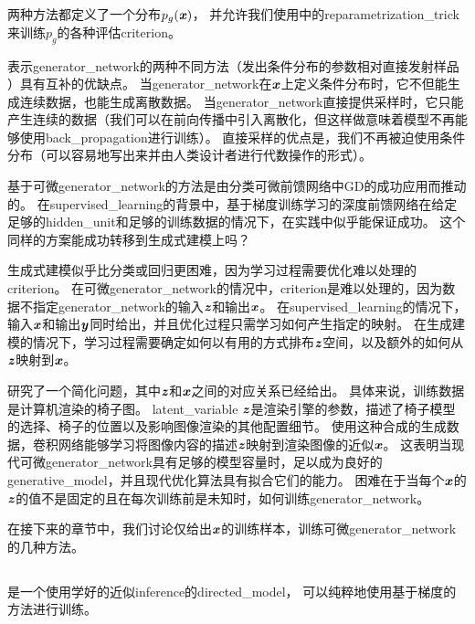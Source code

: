 两种方法都定义了一个分布$p_g(\boldsymbol{\mathit{x}})$， 并允许我们使用中的\gls{reparametrization_trick}来训练$p_g$的各种评估\gls{criterion}。


表示\gls{generator_network}的两种不同方法（发出条件分布的参数相对直接发射样品 ）具有互补的优缺点。
当\gls{generator_network}在$\boldsymbol{\mathit{x}}$上定义条件分布时，它不但能生成连续数据，也能生成离散数据。
当\gls{generator_network}直接提供采样时，它只能产生连续的数据（我们可以在前向传播中引入离散化，但这样做意味着模型不再能够使用\gls{back_propagation}进行训练）。
直接采样的优点是，我们不再被迫使用条件分布（可以容易地写出来并由人类设计者进行代数操作的形式）。

基于可微\gls{generator_network}的方法是由分类可微前馈网络中\gls{GD}的成功应用而推动的。
在\gls{supervised_learning}的背景中，基于梯度训练学习的深度前馈网络在给定足够的\gls{hidden_unit}和足够的训练数据的情况下，在实践中似乎能保证成功。
这个同样的方案能成功转移到生成式建模上吗？

生成式建模似乎比分类或回归更困难，因为学习过程需要优化难以处理的\gls{criterion}。
在可微\gls{generator_network}的情况中，\gls{criterion}是难以处理的，因为数据不指定\gls{generator_network}的输入$\boldsymbol{\mathit{z}}$和输出$\boldsymbol{\mathit{x}}$。
在\gls{supervised_learning}的情况下，输入$\boldsymbol{\mathit{x}}$和输出$\boldsymbol{\mathit{y}}$同时给出，并且优化过程只需学习如何产生指定的映射。
在生成建模的情况下，学习过程需要确定如何以有用的方式排布$\boldsymbol{\mathit{z}}$空间，以及额外的如何从$\boldsymbol{\mathit{z}}$映射到$\boldsymbol{\mathit{x}}$。

\citet{dosovitskiy2015learning}研究了一个简化问题，其中$\boldsymbol{\mathit{z}}$和$\boldsymbol{\mathit{x}}$之间的对应关系已经给出。
具体来说，训练数据是计算机渲染的椅子图。
\gls{latent_variable} $\boldsymbol{\mathit{z}}$是渲染引擎的参数，描述了椅子模型的选择、椅子的位置以及影响图像渲染的其他配置细节。
使用这种合成的生成数据，卷积网络能够学习将图像内容的描述$\boldsymbol{\mathit{z}}$映射到渲染图像的近似$\boldsymbol{\mathit{x}}$。
这表明当现代可微\gls{generator_network}具有足够的模型容量时，足以成为良好的\gls{generative_model}，并且现代优化算法具有拟合它们的能力。
困难在于当每个$\boldsymbol{\mathit{x}}$的$\boldsymbol{\mathit{z}}$的值不是固定的且在每次训练前是未知时，如何训练\gls{generator_network}。


在接下来的章节中，我们讨论仅给出$\boldsymbol{\mathit{x}}$的训练样本，训练可微\gls{generator_network}的几种方法。


\subsection{}
\label{sec:variational_autoencoders}
\citep{Kingma-arxiv2013,Rezende-et-al-ICML2014}是一个使用学好的近似\gls{inference}的\gls{directed_model}， 可以纯粹地使用基于梯度的方法进行训练。


